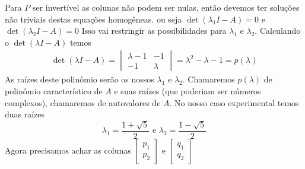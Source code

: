 \documentclass{beamer}
\begin{document}
\begin{frame}
  Para $P$ ser invertível as colunas não podem ser nulas, então
  devemos ter soluções não triviais destas equações homogêneas.
  ou seja $\det(\lambda_1I -A) = 0$ e $\det(\lambda_2I-A)=0$
  Isso vai restringir as possibilidades para $\lambda_1$ e $\lambda_2$.
  Calculando o $\det(\lambda I -A)$ temos
  \begin{gather*}
    \det(\lambda I -A) = \begin{vmatrix}
      \lambda - 1 & -1 \\
      -1 & \lambda
    \end{vmatrix} = \lambda^2 -\lambda -1 = p(\lambda)
  \end{gather*}
  As raízes deste polinômio serão os nossos $\lambda_1$ e $\lambda_2$. Chamaremos $p(\lambda)$ de polinômio característico
  de $A$ e suas raízes (que poderiam ser números complexos), chamaremos de autovalores de $A$.
  No nosso caso experimental temos duas raízes
  $$\lambda_1=\frac{1+\sqrt{5}}{2} \text{ e } \lambda_2=\frac{1-\sqrt{5}}{2}$$
  Agora precisamos achar as colunas $\begin{bmatrix}
    p_1 \\ p_2
  \end{bmatrix}$ e $\begin{bmatrix}
    q_1 \\ q_2
  \end{bmatrix}$

\end{frame}
\end{document}
